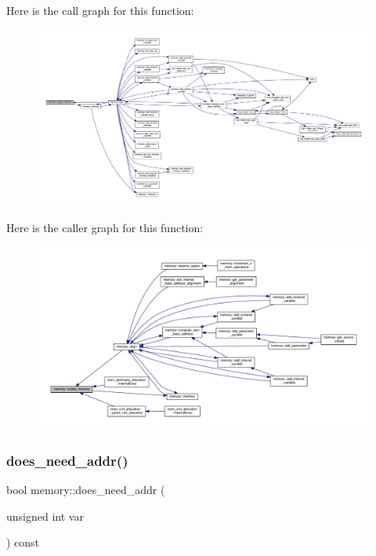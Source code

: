 Here is the call graph for this function\+:
\nopagebreak
\begin{figure}[H]
\begin{center}
\leavevmode
\includegraphics[width=350pt]{d8/d99/classmemory_a169a0772cd5c322a06f7f433cb9c27af_cgraph}
\end{center}
\end{figure}
Here is the caller graph for this function\+:
\nopagebreak
\begin{figure}[H]
\begin{center}
\leavevmode
\includegraphics[width=350pt]{d8/d99/classmemory_a169a0772cd5c322a06f7f433cb9c27af_icgraph}
\end{center}
\end{figure}
\mbox{\label{classmemory_a6b6f8242a9b610f0a7942ee442e7a123}} 
\subsubsection{\texorpdfstring{does\+\_\+need\+\_\+addr()}{does\_need\_addr()}}
{\footnotesize\ttfamily bool memory\+::does\+\_\+need\+\_\+addr (\begin{DoxyParamCaption}\item[{unsigned int}]{var }\end{DoxyParamCaption}) const\hspace{0.3cm}{\ttfamily [inline]}}



